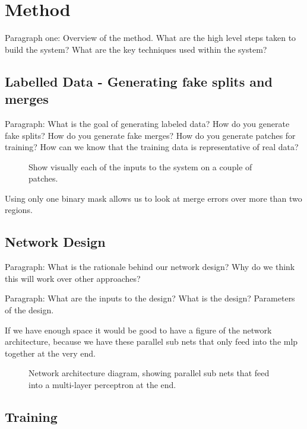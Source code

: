 \section{Method}

Paragraph one: Overview of the method. What are the high level steps taken to build the system? What are the key techniques used within the system?

\subsection{Labelled Data - Generating fake splits and merges}

Paragraph: What is the goal of generating labeled data? How do you generate fake splits? How do you generate fake merges? How do you generate patches for training? How can we know that the training data is representative of real data?

\begin{figure}
\caption{Show visually each of the inputs to the system on a couple of patches.}
\end{figure}

Using only one binary mask allows us to look at merge errors over more than two regions.


\subsection{Network Design}

Paragraph: What is the rationale behind our network design? Why do we think this will work over other approaches? 

Paragraph: What are the inputs to the design? What is the design? Parameters of the design.

If we have enough space it would be good to have a figure of the network architecture, because we have these 
parallel sub nets that only feed into the mlp together at the very end. 

\begin{figure}[t]
\caption{Network architecture diagram, showing parallel sub nets that feed into a multi-layer perceptron at the end.}
\end{figure}

\subsection{Training}

